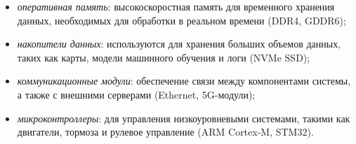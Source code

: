 \begin{itemize}[leftmargin=*]
	\item \textit{оперативная память}:
	высокоскоростная память для временного хранения данных, необходимых для обработки в реальном времени (DDR4, GDDR6);

	\item \textit{накопители данных}:
	используются для хранения больших объемов данных, таких как карты, модели машинного обучения и логи (NVMe SSD);

	\item \textit{коммуникационные модули}:
	обеспечение связи между компонентами системы, а также с внешними серверами (Ethernet, 5G-модули);

	\item \textit{микроконтроллеры}:
	для управления низкоуровневыми системами, такими как двигатели, тормоза и рулевое управление (ARM Cortex-M, STM32).
\end{itemize}

